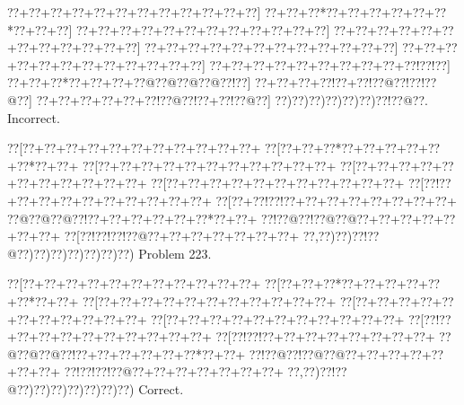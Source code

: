 \documentclass[a5paper]{article}
\begin{document}
\begin{center}
{\goo
\0??+\0??+\0??+\0??+\0??+\0??+\0??+\0??+\0??+\0??+\0??+\0??]
\0??+\0??+\0??*\0??+\0??+\0??+\0??+\0??+\0??*\0??+\0??+\0??]
\0??+\0??+\0??+\0??+\0??+\0??+\0??+\0??+\0??+\0??+\0??+\0??]
\0??+\0??+\0??+\0??+\0??+\0??+\0??+\0??+\0??+\0??+\0??+\0??]
\0??+\0??+\0??+\0??+\0??+\0??+\0??+\0??+\0??+\0??+\0??+\0??]
\0??+\0??+\0??+\0??+\0??+\0??+\0??+\0??+\0??+\0??+\0??+\0??]
\0??+\0??+\0??+\0??+\0??+\0??+\0??+\0??+\0??+\0??!\0??!\0??]
\0??+\0??+\0??*\0??+\0??+\0??+\0??@\0??@\0??@\0??@\0??!\0??]
\0??+\0??+\0??+\0??!\0??+\0??!\0??@\0??!\0??!\0??@\0??]
\0??+\0??+\0??+\0??+\0??+\0??!\0??@\0??!\0??+\0??!\0??@\0??]
\0??)\0??)\0??)\0??)\0??)\0??)\0??!\0??@\0??.
}
Incorrect. 

\end{center}
\newpage
\begin{center}
{\goo
\0??[\0??+\0??+\0??+\0??+\0??+\0??+\0??+\0??+\0??+\0??+\0??+
\0??[\0??+\0??+\0??*\0??+\0??+\0??+\0??+\0??+\0??*\0??+\0??+
\0??[\0??+\0??+\0??+\0??+\0??+\0??+\0??+\0??+\0??+\0??+\0??+
\0??[\0??+\0??+\0??+\0??+\0??+\0??+\0??+\0??+\0??+\0??+\0??+
\0??[\0??+\0??+\0??+\0??+\0??+\0??+\0??+\0??+\0??+\0??+\0??+
\0??[\0??!\0??+\0??+\0??+\0??+\0??+\0??+\0??+\0??+\0??+\0??+
\0??[\0??+\0??!\0??!\0??+\0??+\0??+\0??+\0??+\0??+\0??+\0??+
\0??@\0??@\0??@\0??!\0??+\0??+\0??+\0??+\0??+\0??*\0??+\0??+
\0??!\0??@\0??!\0??@\0??@\0??+\0??+\0??+\0??+\0??+\0??+\0??+
\0??[\0??!\0??!\0??!\0??@\0??+\0??+\0??+\0??+\0??+\0??+\0??+
\0??,\0??)\0??)\0??!\0??@\0??)\0??)\0??)\0??)\0??)\0??)\0??)
}
Problem 223.

\end{center}
\begin{center}
{\goo
\0??[\0??+\0??+\0??+\0??+\0??+\0??+\0??+\0??+\0??+\0??+\0??+
\0??[\0??+\0??+\0??*\0??+\0??+\0??+\0??+\0??+\0??*\0??+\0??+
\0??[\0??+\0??+\0??+\0??+\0??+\0??+\0??+\0??+\0??+\0??+\0??+
\0??[\0??+\0??+\0??+\0??+\0??+\0??+\0??+\0??+\0??+\0??+\0??+
\0??[\0??+\0??+\0??+\0??+\0??+\0??+\0??+\0??+\0??+\0??+\0??+
\0??[\0??!\0??+\0??+\0??+\0??+\0??+\0??+\0??+\0??+\0??+\0??+
\0??[\0??!\0??!\0??+\0??+\0??+\0??+\0??+\0??+\0??+\0??+
\0??@\0??@\0??@\0??!\0??+\0??+\0??+\0??+\0??+\0??*\0??+\0??+
\0??!\0??@\0??!\0??@\0??@\0??+\0??+\0??+\0??+\0??+\0??+\0??+
\0??!\0??!\0??!\0??@\0??+\0??+\0??+\0??+\0??+\0??+\0??+
\0??,\0??)\0??!\0??@\0??)\0??)\0??)\0??)\0??)\0??)\0??)
}
Correct. 

\end{center}
\end{document}
